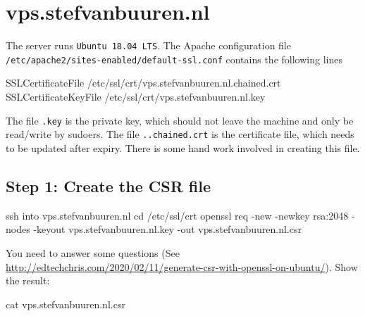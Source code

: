 \documentclass[
]{book}
\newenvironment{Shaded}{\begin{snugshade}}{\end{snugshade}}
\newcommand{\AttributeTok}[1]{\textcolor[rgb]{0.77,0.63,0.00}{#1}}
\newcommand{\BuiltInTok}[1]{#1}
\newcommand{\ExtensionTok}[1]{#1}
\newcommand{\FunctionTok}[1]{\textcolor[rgb]{0.00,0.00,0.00}{#1}}
\newcommand{\NormalTok}[1]{#1}
\begin{document}
\hypertarget{vps.stefvanbuuren.nl}{%
\section{vps.stefvanbuuren.nl}\label{vps.stefvanbuuren.nl}}

The server runs \texttt{Ubuntu\ 18.04\ LTS}. The Apache configuration file \texttt{/etc/apache2/sites-enabled/default-ssl.conf} contains the following lines

\begin{Shaded}
\begin{Highlighting}[]
        \ExtensionTok{SSLCertificateFile}\NormalTok{  /etc/ssl/crt/vps.stefvanbuuren.nl.chained.crt}
        \ExtensionTok{SSLCertificateKeyFile}\NormalTok{   /etc/ssl/crt/vps.stefvanbuuren.nl.key}
\end{Highlighting}
\end{Shaded}

The file \texttt{.key} is the private key, which should not leave the machine and only be read/write by sudoers. The file \texttt{..chained.crt} is the certificate file, which needs to be updated after expiry. There is some hand work involved in creating this file.

\hypertarget{step-1-create-the-csr-file}{%
\subsection{Step 1: Create the CSR file}\label{step-1-create-the-csr-file}}

\begin{Shaded}
\begin{Highlighting}[]
\FunctionTok{ssh}\NormalTok{ into vps.stefvanbuuren.nl}
\BuiltInTok{cd}\NormalTok{ /etc/ssl/crt}
\ExtensionTok{openssl}\NormalTok{ req }\AttributeTok{{-}new} \AttributeTok{{-}newkey}\NormalTok{ rsa:2048 }\AttributeTok{{-}nodes} \AttributeTok{{-}keyout}\NormalTok{ vps.stefvanbuuren.nl.key }\AttributeTok{{-}out}\NormalTok{ vps.stefvanbuuren.nl.csr}
\end{Highlighting}
\end{Shaded}

You need to answer some questions (See \url{http://edtechchris.com/2020/02/11/generate-csr-with-openssl-on-ubuntu/}). Show the result:

\begin{Shaded}
\begin{Highlighting}[]
\FunctionTok{cat}\NormalTok{ vps.stefvanbuuren.nl.csr}
\end{Highlighting}
\end{Shaded}
\end{document}
